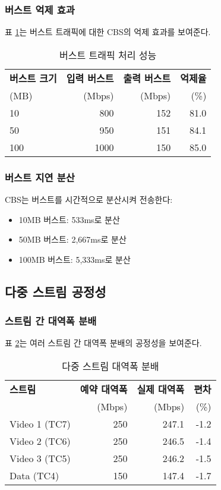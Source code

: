 \documentclass[twocolumn,10pt]{article}
\begin{document}
\subsubsection{버스트 억제 효과}

표 \ref{tab:burst_suppression}는 버스트 트래픽에 대한 CBS의 억제 효과를 보여준다.

\begin{table}[h]
\centering
\caption{버스트 트래픽 처리 성능}
\label{tab:burst_suppression}
\begin{tabular}{lrrr}
\toprule
\textbf{버스트 크기} & \textbf{입력 버스트} & \textbf{출력 버스트} & \textbf{억제율} \\
(MB) & (Mbps) & (Mbps) & (\%) \\
\midrule
10 & 800 & 152 & 81.0 \\
50 & 950 & 151 & 84.1 \\
100 & 1000 & 150 & 85.0 \\
\bottomrule
\end{tabular}
\end{table}

\subsubsection{버스트 지연 분산}

CBS는 버스트를 시간적으로 분산시켜 전송한다:

\begin{itemize}
    \item 10MB 버스트: 533ms로 분산
    \item 50MB 버스트: 2,667ms로 분산
    \item 100MB 버스트: 5,333ms로 분산
\end{itemize}

\subsection{다중 스트림 공정성}

\subsubsection{스트림 간 대역폭 분배}

표 \ref{tab:fairness}는 여러 스트림 간 대역폭 분배의 공정성을 보여준다.

\begin{table}[h]
\centering
\caption{다중 스트림 대역폭 분배}
\label{tab:fairness}
\begin{tabular}{lrrr}
\toprule
\textbf{스트림} & \textbf{예약 대역폭} & \textbf{실제 대역폭} & \textbf{편차} \\
 & (Mbps) & (Mbps) & (\%) \\
\midrule
Video 1 (TC7) & 250 & 247.1 & -1.2 \\
Video 2 (TC6) & 250 & 246.5 & -1.4 \\
Video 3 (TC5) & 250 & 246.2 & -1.5 \\
Data (TC4) & 150 & 147.4 & -1.7 \\
\bottomrule
\end{tabular}
\end{table}
\end{document}
